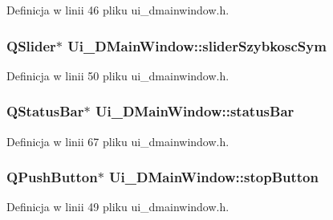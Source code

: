 Definicja w linii 46 pliku ui\+\_\+dmainwindow.\+h.

\hypertarget{class_ui___d_main_window_a8d12f07935a52a597e57eddf50e5c98f}{}
\subsubsection[{slider\+Szybkosc\+Sym}]{\setlength{\rightskip}{0pt plus 5cm}Q\+Slider$\ast$ Ui\+\_\+\+D\+Main\+Window\+::slider\+Szybkosc\+Sym}\label{class_ui___d_main_window_a8d12f07935a52a597e57eddf50e5c98f}


Definicja w linii 50 pliku ui\+\_\+dmainwindow.\+h.

\hypertarget{class_ui___d_main_window_ac9e025e7279839dd7ab1686456d1ae21}{}
\subsubsection[{status\+Bar}]{\setlength{\rightskip}{0pt plus 5cm}Q\+Status\+Bar$\ast$ Ui\+\_\+\+D\+Main\+Window\+::status\+Bar}\label{class_ui___d_main_window_ac9e025e7279839dd7ab1686456d1ae21}


Definicja w linii 67 pliku ui\+\_\+dmainwindow.\+h.

\hypertarget{class_ui___d_main_window_a1fe7797fff349a0f0d47d90c8438f386}{}
\subsubsection[{stop\+Button}]{\setlength{\rightskip}{0pt plus 5cm}Q\+Push\+Button$\ast$ Ui\+\_\+\+D\+Main\+Window\+::stop\+Button}\label{class_ui___d_main_window_a1fe7797fff349a0f0d47d90c8438f386}


Definicja w linii 49 pliku ui\+\_\+dmainwindow.\+h.

\hypertarget{class_ui___d_main_window_abba1dae1dd835c7a7dd39da623cd4580}{}
